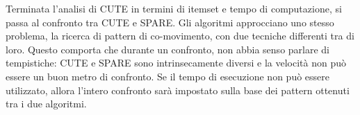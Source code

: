 Terminata l'analisi di CUTE in termini di itemset e tempo di computazione, si passa al confronto tra CUTE e SPARE.
Gli algoritmi approcciano uno stesso problema, la ricerca di pattern di co-movimento, con due tecniche differenti tra di loro.
Questo comporta che durante un confronto, non abbia senso parlare di tempistiche: CUTE e SPARE sono intrinsecamente diversi e la velocità non può essere un buon metro di confronto.
Se il tempo di esecuzione non può essere utilizzato, allora l'intero confronto sarà impostato sulla base dei pattern ottenuti tra i due algoritmi.
